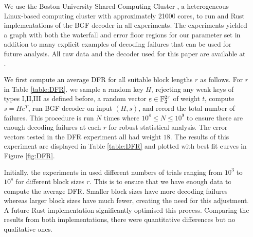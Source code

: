 We use the Boston University Shared Computing Cluster \cite{SCC}, a heterogeneous Linux-based computing cluster with approximately 21000 cores, to run \SageMath{} and Rust implementations of the BGF decoder \cite{BIKE,DGK20a} in all experiments. The experiments yielded a graph with both the waterfall and error floor regions for our parameter set in addition to many explicit examples of decoding failures that can be used for future analysis. All raw data and the decoder used for this paper are available at \cite{raw-data-decoder}.

We first compute an average DFR for all suitable block lengths $r$ as follows.  For $r$ in Table \ref{table:DFR}, we sample a random key $H$, rejecting any weak keys of types I,II,III as defined before, a random vector $e \in \mathbb{F}_2^{2r}$ of weight $t$, compute $s=He^T$, run BGF decoder on input $(H, s)$, and record the total number of failures.  This procedure is run $N$ times where $10^8 \le N \le 10^9$ to ensure there are enough decoding failures at each $r$ for robust statistical analysis.
The error vectors tested in the DFR experiment all had weight $18$. The results of this experiment are displayed in Table \ref{table:DFR} and plotted with best fit curves in Figure \ref{fig:DFR}.

\begin{remark}
Initially, the experiments in \SageMath{} used different numbers of trials ranging from $10^3$ to $10^8$ for different block sizes $r$. This is to ensure that we have enough data to compute the average DFR. Smaller block sizes have more decoding failures whereas larger block sizes have much fewer, creating the need for this adjustment. A future Rust implementation significantly optimised this process. Comparing the results from both implementations, there were quantitative differences but no qualitative ones.
\end{remark}

